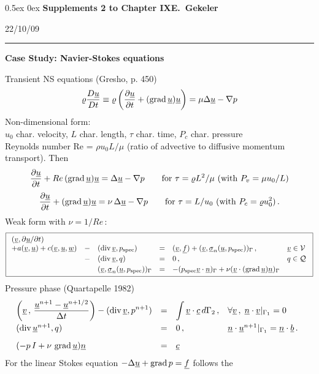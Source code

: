 \documentclass[12pt,a4paper,USenglish,twoside]{book}
\begin{document}
\setlength{\fboxsep}{1ex}
\newcommand{\Release}{22/10/09}
\addtolength{\abovedisplayshortskip}{-1ex}
\setlength{\fboxsep}{1.5ex}
\parskip0.5ex
\parindent0ex
\mainmatter
%
{\large\bf Supplements 2 to Chapter IX\hfill E.\ Gekeler
}
\par
\vspace{-1mm}
\hfill{\footnotesize\Release\ }
\par
\vspace{-2mm}
\rule{\textwidth}{1pt}
\par\vspace{2ex}
{\bf Case Study: Navier-Stokes equations}
\par
%
Transient NS equations (Gresho, p. 450)
%
\[
\rho \frac{D\u}{D t} \equiv 
\rho \left(\frac{\da \u}{\da t} +  (\grad \u)\u\right) 
= \mu \Delta \u - \nabla p 
\] 
Non-dimensional form:\\
$u_0$ char. velocity, $L$ char. length, $\tau$ char. time, $P_c$ char. pressure\\
{\sc Reynolds} number Re = $\rho u_0 L/\mu$ 
(ratio of advective to diffusive momentum transport). Then
\[
\frac{\da \u}{\da t} +  Re \,(\grad \u)\u 
=   \Delta \u - \nabla p \quad \quad
\text{for $\tau = \rho L^2/\mu$ (with $P_v =  \mu u_0/L$)}
\] 
%
\[
\frac{\da \u}{\da t} +  (\grad \u)\u 
= \nu\, \Delta \u - \nabla p \quad \quad
\text{for $\tau = L/u_0$ (with $P_c = \rho u^2_0$)}\,.
\] 
Weak form with $\nu = 1/Re$\,:
\begin{equation} \label{e0811.4}
\fbox{$\
\ba{.}{llllll}
(\v,\da \u/\da t)\\
 + a(\v,\u)  + c(\v,\u,\w)&-&(\div \v,p_{\rm spec}) &=& (\v,\f)
+ (\v,\ul{\sigma}_n(\u,p_{\rm spec}))_{\Gamma}\,, & \v \in \V \\[0.5ex]
&-&(\div \v,q) &=& 0\,, & q \in \Q\\[0.5ex]
&&(\v,\ul{\sigma}_n(\u,p_{\rm spec}))_{\Gamma}
&=& -(p_{\rm spec}\v\cdot \n)_{\Gamma} + \nu(\v\cdot (\grad \u)\n)_{\Gamma} 
\ea{.}
$}
\end{equation}
Pressure phase (Quartapelle 1982)
\[
\ba{.}{llll} \dis
\left(\v \,,\, \frac{\u^{n+1} - \u^{n+1/2}}{\Delta t}\right)
- (\div \v, p^{n+1}) &=& \dis \int\v \cdot \c\, d\Gamma_2\,, & \forall \v \,,\;
\n\cdot\v|_{\Gamma_1} = 0\\[2ex]
(\div \u^{n+1},q) &=& 0\,, & \n\cdot\u^{n+1}|_{\Gamma_1}  = \n\cdot \b\,.\\[2ex]
(-p\,I + \nu \,\grad \u)\n &=& \c

\ea{.}
\]
For the linear {\sc Stokes} equation $-\Delta \u + \grad p = \f$ follows the
\end{document}
